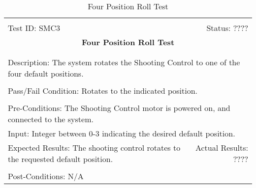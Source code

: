 \documentclass[11pt]{article}
\begin{document}
\begin{center}
\begin{table}[H]
\begin{tabular}{|l r|}\hline&\\[-2mm]
	Test ID: SMC3	&Status: ????\\[-3mm]
	\multicolumn{2}{|c|}{\textbf{\large{Four Position Roll Test}}}\\&\\\hline&\\[-3mm]
	\multicolumn{2}{|p{\textwidth}|}{Description: The system rotates the Shooting Control to one of the four default positions.}\\[1mm]\hline&\\[-3mm]
	\multicolumn{2}{|p{\textwidth}|}{Pass/Fail Condition: Rotates to the indicated position.}\\[1mm]\hline&\\[-3mm]
	\multicolumn{2}{|p{\textwidth}|}{Pre-Conditions: The Shooting Control motor is powered on, and connected to the system.
}\\[4mm]
	\multicolumn{2}{|p{\textwidth}|}{Input: Integer between 0-3 indicating the desired default position.}\\[2mm]\hline
	\multicolumn{1}{|p{0.49\textwidth}}{Expected Results: The shooting control rotates to the requested default position.
}	&\multicolumn{1}{|p{0.45\textwidth}|}{Actual Results: ????}\\\hline&\\[-3mm]
	\multicolumn{2}{|p{\textwidth}|}{Post-Conditions: N/A}\\\hline
\end{tabular}
\caption{Four Position Roll Test}
\end{table}
\end{center}
\end{document}
